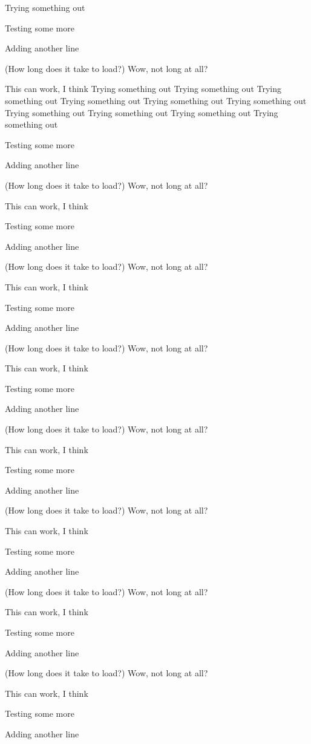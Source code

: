 \documentclass{article}
\begin{document}
Trying something out

Testing some more

Adding another line

(How long does it take to load?)
Wow, not long at all?

This can work, I think
Trying something out
Trying something out
Trying something out
Trying something out
Trying something out
Trying something out
Trying something out
Trying something out
Trying something out
Trying something out

Testing some more

Adding another line

(How long does it take to load?)
Wow, not long at all?

This can work, I think

Testing some more

Adding another line

(How long does it take to load?)
Wow, not long at all?

This can work, I think

Testing some more

Adding another line

(How long does it take to load?)
Wow, not long at all?

This can work, I think

Testing some more

Adding another line

(How long does it take to load?)
Wow, not long at all?

This can work, I think

Testing some more

Adding another line

(How long does it take to load?)
Wow, not long at all?

This can work, I think

Testing some more

Adding another line

(How long does it take to load?)
Wow, not long at all?

This can work, I think

Testing some more

Adding another line

(How long does it take to load?)
Wow, not long at all?

This can work, I think

Testing some more

Adding another line
\end{document}
